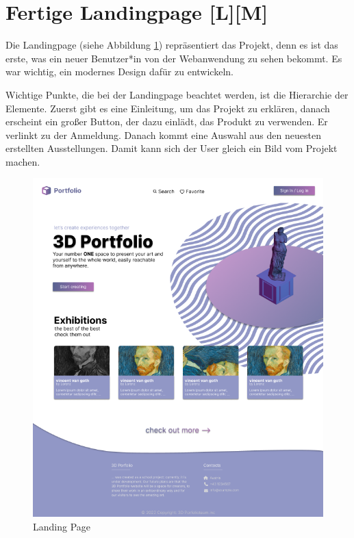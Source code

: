 \section{Fertige Landingpage [L][M]}
Die Landingpage (siehe Abbildung \ref{fig:impl:finishedLandingpage}) repräsentiert das Projekt, denn es ist das erste, was ein neuer Benutzer*in von der Webanwendung zu sehen bekommt. Es war wichtig, ein modernes Design dafür zu entwickeln.

Wichtige Punkte, die bei der Landingpage beachtet werden, ist die Hierarchie der Elemente. Zuerst gibt es eine Einleitung, um das Projekt zu erklären, danach erscheint ein großer Button, der dazu einlädt, das Produkt zu verwenden. Er verlinkt zu der Anmeldung. Danach kommt eine Auswahl aus den neuesten erstellten Ausstellungen. Damit kann sich der User gleich ein Bild vom Projekt machen.

\begin{figure}
    \centering
    \includegraphics[scale=.5]{pics/startingpage.png}
    \caption{Landing Page}
    \label{fig:impl:finishedLandingpage}
\end{figure}

